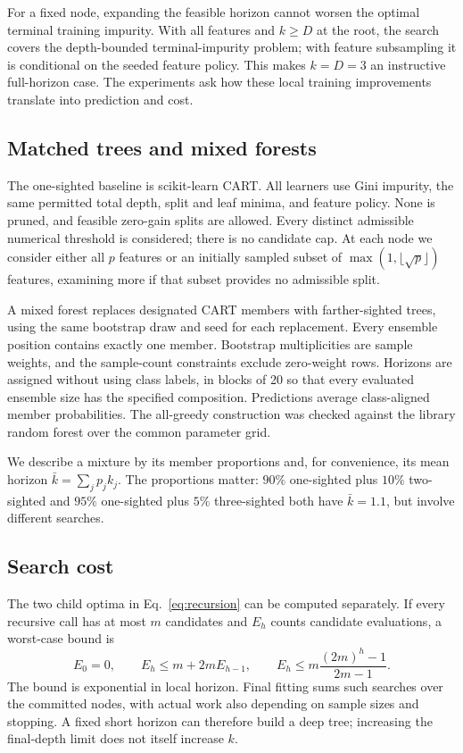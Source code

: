 \documentclass[final,5p,times]{elsarticle}
\begin{document}
For a fixed node, expanding the feasible horizon cannot worsen the optimal terminal training impurity. With all features and $k\geq D$ at the root, the search covers the depth-bounded terminal-impurity problem; with feature subsampling it is conditional on the seeded feature policy. This makes $k=D=3$ an instructive full-horizon case. The experiments ask how these local training improvements translate into prediction and cost.

\subsection{Matched trees and mixed forests}
The one-sighted baseline is scikit-learn CART. All learners use Gini impurity, the same permitted total depth, split and leaf minima, and feature policy. None is pruned, and feasible zero-gain splits are allowed. Every distinct admissible numerical threshold is considered; there is no candidate cap. At each node we consider either all $p$ features or an initially sampled subset of $\max(1,\lfloor\sqrt p\rfloor)$ features, examining more if that subset provides no admissible split.

A mixed forest replaces designated CART members with farther-sighted trees, using the same bootstrap draw and seed for each replacement. Every ensemble position contains exactly one member. Bootstrap multiplicities are sample weights, and the sample-count constraints exclude zero-weight rows. Horizons are assigned without using class labels, in blocks of 20 so that every evaluated ensemble size has the specified composition. Predictions average class-aligned member probabilities. The all-greedy construction was checked against the library random forest over the common parameter grid.

We describe a mixture by its member proportions and, for convenience, its mean horizon $\bar k=\sum_j p_j k_j$. The proportions matter: $90\%$ one-sighted plus $10\%$ two-sighted and $95\%$ one-sighted plus $5\%$ three-sighted both have $\bar k=1.1$, but involve different searches.

\subsection{Search cost}
The two child optima in Eq.~\eqref{eq:recursion} can be computed separately. If every recursive call has at most $m$ candidates and $E_h$ counts candidate evaluations, a worst-case bound is
\begin{equation}
 E_0=0,\qquad E_h\leq m+2m E_{h-1},\qquad
 E_h\leq m\frac{(2m)^h-1}{2m-1}.
\end{equation}
The bound is exponential in local horizon. Final fitting sums such searches over the committed nodes, with actual work also depending on sample sizes and stopping. A fixed short horizon can therefore build a deep tree; increasing the final-depth limit does not itself increase $k$.
\end{document}

